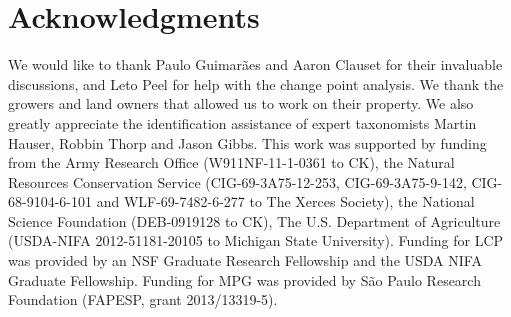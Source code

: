 \documentclass[12pt]{article}
\begin{document}



\section*{Acknowledgments}
\label{sec:acknowledge}

We would like to thank Paulo Guimar{\~a}es and Aaron Clauset for their
invaluable discussions, and Leto Peel for help with the change point
analysis.  We thank the growers and land owners that allowed us to
work on their property.  We also greatly appreciate the identification
assistance of expert taxonomists Martin Hauser, Robbin Thorp and Jason
Gibbs.  This work was supported by funding from the Army Research
Office (W911NF-11-1-0361 to CK), the Natural Resources Conservation
Service (CIG-69-3A75-12-253, CIG-69-3A75-9-142, CIG-68-9104-6-101 and
WLF-69-7482-6-277 to The Xerces Society), the National Science
Foundation (DEB-0919128 to CK), The U.S.  Department of Agriculture
(USDA-NIFA 2012-51181-20105 to Michigan State University).  Funding
for LCP was provided by an NSF Graduate Research Fellowship and the
USDA NIFA Graduate Fellowship. Funding for MPG was provided by S{\~a}o
Paulo Research Foundation (FAPESP, grant 2013/13319-5).






\end{document}
